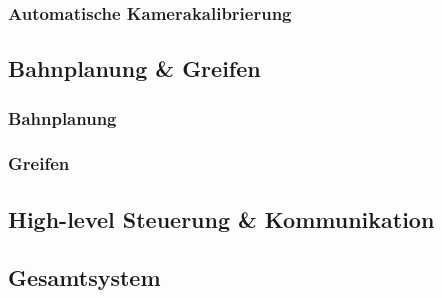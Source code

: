 \documentclass[de,ids]{fziartcl}
\begin{document}
\subsubsection{Automatische Kamerakalibrierung}
\subsection{Bahnplanung \& Greifen}
\subsubsection{Bahnplanung}
\subsubsection{Greifen}
\subsection{High-level Steuerung \& Kommunikation}
\subsection{Gesamtsystem}


\end{document}
